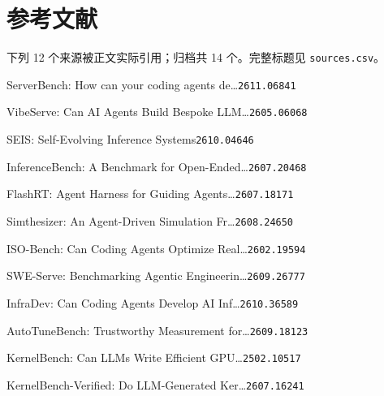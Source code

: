 \section*{参考文献}
\begingroup
\scriptsize
\setlength{\parindent}{0pt}
\setlength{\parskip}{1.4pt}
\noindent 下列 12 个来源被正文实际引用；归档共 14 个。完整标题见 \texttt{sources.csv}。\par
[1] ServerBench: How can your coding agents de\ldots{}\hfill{\texttt{2611.06841}}\par
[2] VibeServe: Can AI Agents Build Bespoke LLM\ldots{}\hfill{\texttt{2605.06068}}\par
[3] SEIS: Self-Evolving Inference Systems\hfill{\texttt{2610.04646}}\par
[4] InferenceBench: A Benchmark for Open-Ended\ldots{}\hfill{\texttt{2607.20468}}\par
[5] FlashRT: Agent Harness for Guiding Agents\ldots{}\hfill{\texttt{2607.18171}}\par
[6] Simthesizer: An Agent-Driven Simulation Fr\ldots{}\hfill{\texttt{2608.24650}}\par
[7] ISO-Bench: Can Coding Agents Optimize Real\ldots{}\hfill{\texttt{2602.19594}}\par
[8] SWE-Serve: Benchmarking Agentic Engineerin\ldots{}\hfill{\texttt{2609.26777}}\par
[9] InfraDev: Can Coding Agents Develop AI Inf\ldots{}\hfill{\texttt{2610.36589}}\par
[10] AutoTuneBench: Trustworthy Measurement for\ldots{}\hfill{\texttt{2609.18123}}\par
[11] KernelBench: Can LLMs Write Efficient GPU\ldots{}\hfill{\texttt{2502.10517}}\par
[12] KernelBench-Verified: Do LLM-Generated Ker\ldots{}\hfill{\texttt{2607.16241}}\par
\endgroup
